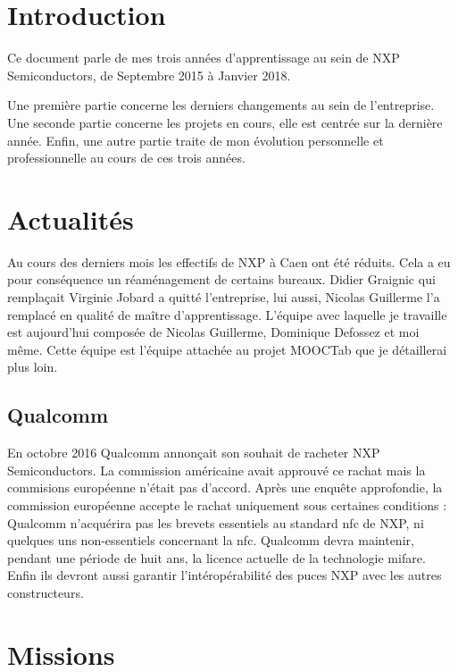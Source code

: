 \documentclass[french,12pt,a4paper,titlepage,openright,openbib]{report}
\begin{document}
\chapter{Introduction}

Ce document parle de mes trois années d'apprentissage au sein de NXP Semiconductors, de Septembre 2015 à Janvier 2018.

Une première partie concerne les derniers changements au sein de l'entreprise.
Une seconde partie concerne les projets en cours, elle est centrée sur la dernière année.
Enfin, une autre partie traite de mon évolution personnelle et professionnelle au cours de ces trois années.

\chapter{Actualités}

Au cours des derniers mois les effectifs de NXP à Caen ont été réduits. Cela a eu pour conséquence un réaménagement de certains bureaux.
Didier Graignic qui remplaçait Virginie Jobard a quitté l'entreprise, lui aussi, Nicolas Guillerme l'a remplacé en qualité de maître d'apprentissage.
L'équipe avec laquelle je travaille est aujourd'hui composée de Nicolas Guillerme, Dominique Defossez et moi même. Cette équipe est l'équipe attachée au projet MOOCTab que je détaillerai plus loin.


\section{Qualcomm}

En octobre 2016 Qualcomm annonçait son souhait de racheter NXP Semiconductors. La commission américaine avait approuvé ce rachat mais la commisions européenne n'était pas d'accord. Après une enquête approfondie, la commission européenne accepte le rachat uniquement sous certaines conditions :
Qualcomm n'acquérira pas les brevets essentiels au standard \gls{nfc} de NXP, ni quelques uns non-essentiels concernant la \gls{nfc}.
Qualcomm devra maintenir, pendant une période de huit ans, la licence actuelle de la technologie \gls{mifare}. Enfin ils devront aussi garantir l'intéropérabilité des puces NXP avec les autres constructeurs.

\printglossary[title={Glossaire}]

\chapter{Missions}
\end{document}
